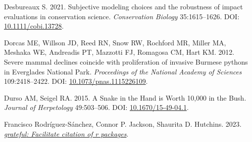 \documentclass[10pt,a4paper]{article}
\newlength{\cslhangindent}
\newenvironment{CSLReferences}[2] %
 {\begin{list}{}{%
  \setlength{\itemindent}{0pt}
  \setlength{\leftmargin}{0pt}
  \setlength{\parsep}{0pt}
  \ifodd #1
   \setlength{\leftmargin}{\cslhangindent}
   \setlength{\itemindent}{-1\cslhangindent}
  \fi
  \setlength{\itemsep}{#2\baselineskip}}}
 {\end{list}}
\begin{document}
\begin{CSLReferences}{1}{0}
Desbureaux S. 2021. Subjective modeling choices and the robustness of impact evaluations in conservation science. \emph{Conservation Biology} 35:1615--1626. DOI: \href{https://doi.org/10.1111/cobi.13728}{10.1111/cobi.13728}.

Dorcas ME, Willson JD, Reed RN, Snow RW, Rochford MR, Miller MA, Meshaka WE, Andreadis PT, Mazzotti FJ, Romagosa CM, Hart KM. 2012. Severe mammal declines coincide with proliferation of invasive {Burmese} pythons in {Everglades} {National} {Park}. \emph{Proceedings of the National Academy of Sciences} 109:2418--2422. DOI: \href{https://doi.org/10.1073/pnas.1115226109}{10.1073/pnas.1115226109}.

Durso AM, Seigel RA. 2015. A {Snake} in the {Hand} is {Worth} 10,000 in the {Bush}. \emph{Journal of Herpetology} 49:503--506. DOI: \href{https://doi.org/10.1670/15-49-04.1}{10.1670/15-49-04.1}.

Francisco Rodríguez-Sánchez, Connor P. Jackson, Shaurita D. Hutchins. 2023. \emph{\href{https://github.com/Pakillo/grateful}{{grateful}: Facilitate citation of r packages}}.


\end{CSLReferences}
\end{document}
